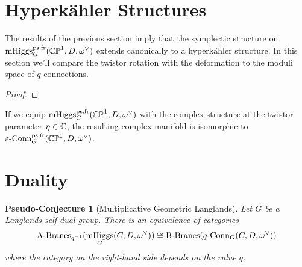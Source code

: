 \documentclass[10pt, oneside]{article}
\DeclareMathOperator{\mhiggs}{mHiggs}
\newcommand{\qconn}{q\text{-Conn}}
\newcommand{\epsconn}{\varepsilon\text{-Conn}}
\newtheorem{pseudoconj}[definition]{Pseudo-Conjecture}
\begin{document}
\begin{remark}
\end{remark}

\section{Hyperk\"ahler Structures}
The results of the previous section imply that the symplectic structure on $\mhiggs_G^{\text{ps,fr}}(\bb{CP}^1,D,\omega^\vee)$ extends canonically to a hyperk\"ahler structure.  In this section we'll compare the twistor rotation with the deformation to the moduli space of $q$-connections. 

\begin{prop}
\end{prop}

\begin{proof}
 
\end{proof}

\begin{corollary}
If we equip $\mhiggs_G^{\text{ps,fr}}(\bb{CP}^1,D,\omega^\vee)$ with the complex structure at the twistor parameter $\eta \in \mathbb{C}$, the resulting complex manifold is isomorphic to $\epsconn_G^{\text{ps,fr}}(\bb{CP}^1,D,\omega^\vee)$.
\end{corollary}



\section{Duality}

\begin{pseudoconj}[Multiplicative Geometric Langlands] \label{multLanglands}
Let $G$ be a Langlands self-dual group.  There is an equivalence of categories
\[\text{A-Branes}_{q^{-1}}(\mhiggs_G(C,D,\omega^\vee)) \iso \text{B-Branes}(\qconn_G(C, D, \omega^\vee))\]
where the category on the right-hand side depends on the value $q$.
\end{pseudoconj}
\end{document}
